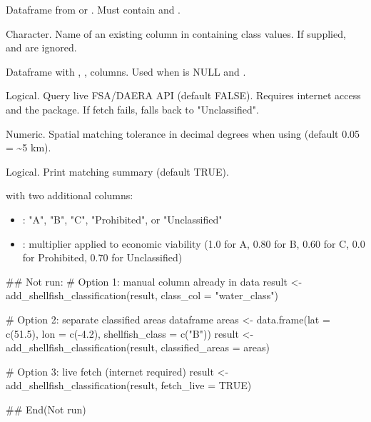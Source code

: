\documentclass[a4paper]{book}
\begin{document}
\begin{Arguments}
\begin{ldescription}
\item[\code{result}] Dataframe from  or .
Must contain  and .

\item[\code{class\_col}] Character. Name of an existing column in  containing
class values. If supplied,  and  are ignored.

\item[\code{classified\_areas}] Dataframe with , , 
columns. Used when  is NULL and .

\item[\code{fetch\_live}] Logical. Query live FSA/DAERA API (default FALSE). Requires
internet access and the  package. If fetch fails, falls back to
"Unclassified".

\item[\code{match\_radius\_deg}] Numeric. Spatial matching tolerance in decimal
degrees when using  (default 0.05 = \textasciitilde{}5 km).

\item[\code{verbose}] Logical. Print matching summary (default TRUE).
\end{ldescription}
\end{Arguments}
%
\begin{Value}
 with two additional columns:
\begin{itemize}

\item{} : "A", "B", "C", "Prohibited", or "Unclassified"
\item{} : multiplier applied to economic viability
(1.0 for A, 0.80 for B, 0.60 for C, 0.0 for Prohibited, 0.70 for
Unclassified)

\end{itemize}

\end{Value}
%
\begin{Examples}
\begin{ExampleCode}
## Not run: 
# Option 1: manual column already in data
result <- add_shellfish_classification(result, class_col = "water_class")

# Option 2: separate classified areas dataframe
areas <- data.frame(lat = c(51.5), lon = c(-4.2), shellfish_class = c("B"))
result <- add_shellfish_classification(result, classified_areas = areas)

# Option 3: live fetch (internet required)
result <- add_shellfish_classification(result, fetch_live = TRUE)

## End(Not run)
\end{ExampleCode}
\end{Examples}
\end{document}
